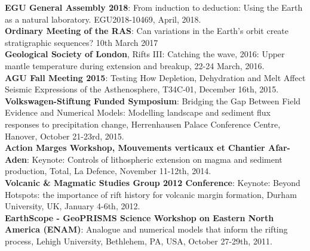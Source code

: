 {\bf EGU General Assembly 2018}: From induction to deduction: Using the Earth as a natural laboratory. EGU2018-10469, April, 2018.\\
{\bf Ordinary Meeting of the RAS}: Can variations in the Earth's orbit create stratigraphic sequences? 10th March 2017\\
{\bf Geological Society of London}, Rifts III: Catching the wave, 2016: Upper mantle temperature during extension and breakup, 22-24 March, 2016.\\
{\bf AGU Fall Meeting 2015}: Testing How Depletion, Dehydration and Melt Affect Seismic Expressions of the Asthenosphere, T34C-01, December 16th, 2015.\\
{\bf Volkswagen-Stiftung Funded Symposium}: Bridging the Gap Between Field Evidence and Numerical Models: Modelling landscape and sediment flux responses to precipitation change, Herrenhausen Palace Conference Centre, Hanover, October 21-23rd, 2015.\\
{\bf Action Marges Workshop, Mouvements verticaux et Chantier Afar-Aden}: Keynote: Controls of lithospheric extension on magma and sediment production, Total, La Defence, November 11-12th, 2014.\\
{\bf Volcanic \& Magmatic Studies Group 2012 Conference}: Keynote: Beyond Hotspots: the importance of rift history for volcanic margin formation, Durham University, UK, January 4-6th, 2012.\\
{\bf EarthScope - GeoPRISMS Science Workshop on Eastern North America (ENAM)}: Analogue and numerical models that inform the rifting process, Lehigh University, Bethlehem, PA, USA, October 27-29th, 2011.\\

